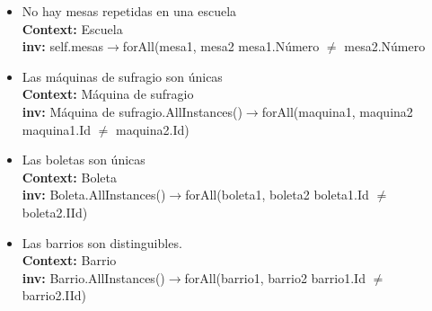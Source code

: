 \documentclass[spanish, 10pt,a4paper]{article}
\numberwithin{equation}{section} %
\begin{document}
\begin{itemize}
	\item No hay mesas repetidas en una escuela
\\	\textbf{Context: }  Escuela
\\	\textbf{inv: } self.mesas$\rightarrow$forAll(mesa1, mesa2 \textbar mesa1.Número $\neq$ mesa2.Número

	\item Las máquinas de sufragio son únicas
\\	\textbf{Context: }  Máquina de sufragio
\\	\textbf{inv: } Máquina de sufragio.AllInstances()$\rightarrow$forAll(maquina1, maquina2 \textbar maquina1.Id $\neq$ maquina2.Id)

	\item Las boletas son únicas
\\	\textbf{Context: }  Boleta
\\	\textbf{inv: } Boleta.AllInstances()$\rightarrow$forAll(boleta1, boleta2 \textbar boleta1.Id $\neq$ boleta2.IId)

	\item Las barrios son distinguibles.
\\	\textbf{Context: }  Barrio
\\	\textbf{inv: } Barrio.AllInstances()$\rightarrow$forAll(barrio1, barrio2 \textbar barrio1.Id $\neq$ barrio2.IId)
\end{itemize}
\end{document}
